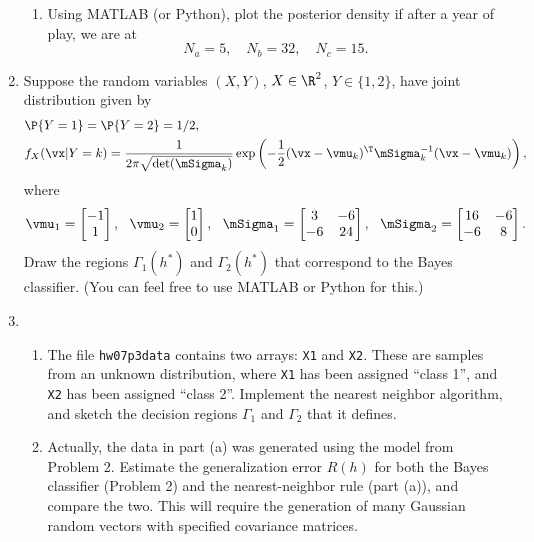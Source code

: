 \documentclass[11pt]{article}
\begin{document}
\begin{enumerate}
\begin{enumerate}
	\item Using MATLAB (or Python), plot the posterior density if after a year of play, we are at
	\[
		N_a = 5,\quad N_b = 32,\quad N_c = 15.
	\]
\end{enumerate}
\vspace{4mm}  
\item Suppose the random variables $(X,Y)$, $X\in\R^2$, $Y\in\{1,2\}$, have joint distribution given by
\begin{align*}
	&\P{Y=1}=\P{Y=2}=1/2,\\
	&f_X(\vx|Y=k) = \frac{1}{2\pi\sqrt{\det(\mSigma_k)}}\exp\left(-\frac{1}{2}(\vx-\vmu_k)^\T\mSigma_k^{-1}(\vx-\vmu_k)\right),
\end{align*}
where
\[
	\vmu_1 = \begin{bmatrix} -1 \\ 1 \end{bmatrix}, ~~
	\vmu_2 = \begin{bmatrix} 1 \\ 0 \end{bmatrix}, ~~
	\mSigma_1 = \begin{bmatrix} 3 & -6 \\ -6 & 24 \end{bmatrix},~~
	\mSigma_2 = \begin{bmatrix} 16 & -6 \\ -6 & 8 \end{bmatrix}.
\]
Draw the regions $\Gamma_1(h^*)$ and $\Gamma_2(h^*)$ that correspond to the Bayes classifier.  (You can feel free to use MATLAB or Python for this.)

\vspace{4mm} 
\item 
\begin{enumerate}
	\item The file \texttt{hw07p3data} contains two arrays: \texttt{X1} and \texttt{X2}.  These are samples from an unknown distribution, where \texttt{X1} has been assigned ``class 1'', and \texttt{X2} has been assigned ``class 2''.  Implement the nearest neighbor algorithm, and sketch the decision regions $\Gamma_1$ and $\Gamma_2$ that it defines.

	\item Actually, the data in part (a) was generated using the model from Problem 2.  Estimate the generalization error $R(h)$ for both the Bayes classifier (Problem 2) and the nearest-neighbor rule (part (a)), and compare the two.  This will require the generation of many Gaussian random vectors with specified covariance matrices.


\end{enumerate}
\end{enumerate}
\end{document}
